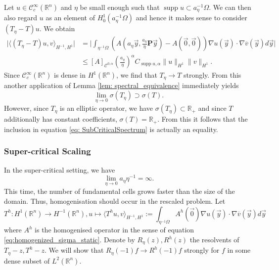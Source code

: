 \documentclass[a4paper,reqno]{amsart}
\numberwithin{equation}{section}
\numberwithin{equation}{section}		%
\numberwithin{figure}{section}			%
\numberwithin{table}{section}				%
\newcommand{\R}{\mathbb{R}}
\theoremstyle{definition}
\newcommand{\<}{\ensuremath \leq}
\renewcommand{\>}{\ensuremath \geq}
\def\e{\eta}
\def\O{\Omega}
\begin{document}
 Let $u \in \mathcal{C}^\infty_c(\R^n)$ and $\e$ be small enough such that $\operatorname{supp}u\subset a_\e^{-1}\O$. We can then also regard $u$ as an element of $H^1_0(a_\e^{-1}\O)$ and hence it makes sense to consider $(T_\eta - T)u$. We obtain
\begin{equation}
    \begin{aligned}
    \lvert\langle (T_\eta - T)u,v\rangle_{H^{-1},H^1}\rvert &= \lvert\int_{\eta^{-1}\Omega}\left(A\left( a_\eta\vec{y}, \frac{a_\eta}{\eta}\textbf{P}\vec{y}\right)-A\left(\vec{0}, \vec{0}\right)\right)\nabla u(\vec{y}) \cdot \nabla \overline{v}(\vec{y}) d\vec{y}\rvert\\
    &\leq [A]_{\mathcal{C}^{0,\alpha}}\left(\frac{a_\eta}{\eta}\right)^\alpha C_{\operatorname{supp}u,\alpha}\lVert u\rVert_{H^1}\lVert v\rVert_{H^1}.
    \end{aligned}
\end{equation}
Since $\mathcal{C}^\infty_c(\R^n)$ is dense in $H^1(\R^n)$, we find that $T_\eta\rightarrow T$ strongly. From this another application of Lemma \ref{lem: spectral_equivalence} immediately yields
\begin{equation}\label{eq: SubCriticalSpectrum}
    \lim_{\eta\rightarrow0}\sigma (T_\eta) \supset\sigma(T).
\end{equation}
 However, since $T_\eta$ is an elliptic operator, we have $\sigma(T_\eta) \subset \R_+$ and since $T$ additionally has constant coefficients, $\sigma (T) = \R_+$. From this it follows that the inclusion in equation \eqref{eq: SubCriticalSpectrum} is actually an equality.
 
\subsubsection{Super-critical Scaling}
In the super-critical setting, we have 
\begin{equation*}
    \lim_{\e\rightarrow 0}a_\e\e^{-1}=\infty.
\end{equation*}
This time, the number of fundamental cells grows faster than the size of the domain. Thus, homogenisation should occur in the rescaled problem. Let
\begin{equation}
    T^h: H^1(\mathbb{R}^n)\rightarrow H^{-1}(\mathbb{R}^n), u\mapsto \langle T^hu,v \rangle_{H^{-1},H^{1}}:=\int_{\eta^{-1}\Omega}A^h\left(\vec{0}\right)\nabla u(\vec{y}) \cdot \nabla \overline{v}(\vec{y}) d\vec{y}
\end{equation}
where $A^h$ is the homogenised operator in the sense of equation \eqref{eq:homogenized_sigma_static}. Denote by $R_\e(z), R^h(z)$ the resolvents of $T_\e -z, T^h-z$. We will show that $R_\e(-1)f\rightarrow R^h(-1)f$ strongly for $f$ in some dense subset of $L^2(\R^n)$.
\end{document}
